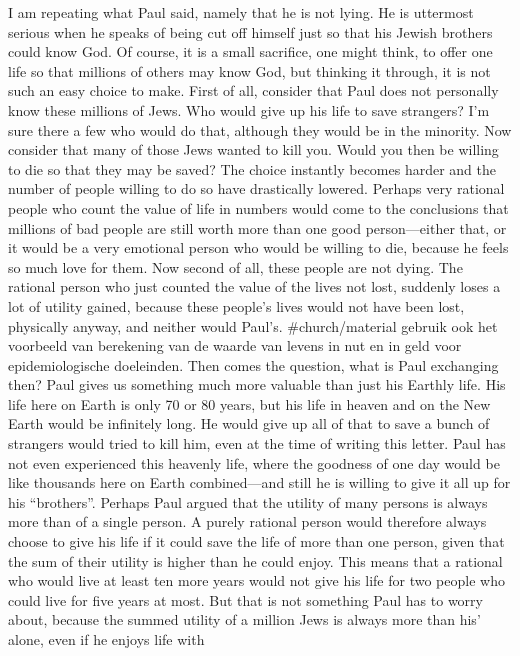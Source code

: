 I am repeating what Paul said, namely that he is not lying. He is
uttermost serious when he speaks of being cut off himself just so that
his Jewish brothers could know God. Of course, it is a small sacrifice,
one might think, to offer one life so that millions of others may know
God, but thinking it through, it is not such an easy choice to make.
First of all, consider that Paul does not personally know these millions
of Jews. Who would give up his life to save strangers? I'm sure there a
few who would do that, although they would be in the minority. Now
consider that many of those Jews wanted to kill you. Would you then be
willing to die so that they may be saved? The choice instantly becomes
harder and the number of people willing to do so have drastically
lowered. Perhaps very rational people who count the value of life in
numbers would come to the conclusions that millions of bad people are
still worth more than one good person---either that, or it would be a
very emotional person who would be willing to die, because he feels so
much love for them. Now second of all, these people are not dying. The
rational person who just counted the value of the lives not lost,
suddenly loses a lot of utility gained, because these people's lives
would not have been lost, physically anyway, and neither would Paul's.
\#church/material gebruik ook het voorbeeld van berekening van de waarde
van levens in nut en in geld voor epidemiologische doeleinden. Then
comes the question, what is Paul exchanging then? Paul gives us
something much more valuable than just his Earthly life. His life here
on Earth is only 70 or 80 years, but his life in heaven and on the New
Earth would be infinitely long. He would give up all of that to save a
bunch of strangers would tried to kill him, even at the time of writing
this letter. Paul has not even experienced this heavenly life, where the
goodness of one day would be like thousands here on Earth combined---and
still he is willing to give it all up for his ``brothers''. Perhaps Paul
argued that the utility of many persons is always more than of a single
person. A purely rational person would therefore always choose to give
his life if it could save the life of more than one person, given that
the sum of their utility is higher than he could enjoy. This means that
a rational who would live at least ten more years would not give his
life for two people who could live for five years at most. But that is
not something Paul has to worry about, because the summed utility of a
million Jews is always more than his' alone, even if he enjoys life with
